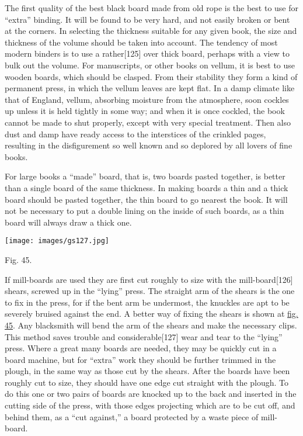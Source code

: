 \documentclass[
]{article}
\begin{document}
{The} first quality of the best black board made from old rope is the
best to use for ``extra'' binding. It will be found to be very hard, and
not easily broken or bent at the corners. In selecting the thickness
suitable for any given book, the size and thickness of the volume should
be taken into account. The tendency of most modern binders is to use a
rather{\protect\hypertarget{Page_125}{}{{[}125{]}}} over thick board,
perhaps with a view to bulk out the volume. For manuscripts, or other
books on vellum, it is best to use wooden boards, which should be
clasped. From their stability they form a kind of permanent press, in
which the vellum leaves are kept flat. In a damp climate like that of
England, vellum, absorbing moisture from the atmosphere, soon cockles up
unless it is held tightly in some way; and when it is once cockled, the
book cannot be made to shut properly, except with very special
treatment. Then also dust and damp have ready access to the interstices
of the crinkled pages, resulting in the disfigurement so well known and
so deplored by all lovers of fine books.

For large books a ``made'' board, that is, two boards pasted together,
is better than a single board of the same thickness. In making boards a
thin and a thick board should be pasted together, the thin board to go
nearest the book. It will not be necessary to put a double lining on the
inside of such boards, as a thin board will always draw a thick one.

\protect\hypertarget{Fig_45}{}{}
\texttt{[image: images/gs127.jpg]}

Fig. 45.

If mill-boards are used they are first cut roughly to size with the
mill-board{\protect\hypertarget{Page_126}{}{{[}126{]}}} shears, screwed
up in the ``lying'' press. The straight arm of the shears is the one to
fix in the press, for if the bent arm be undermost, the knuckles are apt
to be severely bruised against the end. A better way of fixing the
shears is shown at \protect\hyperlink{Fig_45}{fig. 45}. Any blacksmith
will bend the arm of the shears and make the necessary clips. This
method saves trouble and
considerable{\protect\hypertarget{Page_127}{}{{[}127{]}}} wear and tear
to the ``lying'' press. Where a great many boards are needed, they may
be quickly cut in a board machine, but for ``extra'' work they should be
further trimmed in the plough, in the same way as those cut by the
shears. After the boards have been roughly cut to size, they should have
one edge cut straight with the plough. To do this one or two pairs of
boards are knocked up to the back and inserted in the cutting side of
the press, with those edges projecting which are to be cut off, and
behind them, as a ``cut against,'' a board protected by a waste piece of
mill-board.
\end{document}
